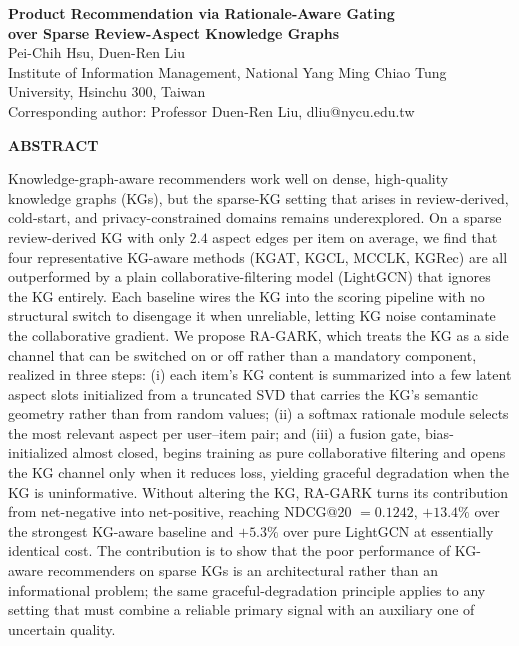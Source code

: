 \documentclass[12pt,a4paper]{article}
\begin{document}
\begin{center}
{\large\bfseries Product Recommendation via Rationale-Aware Gating\\ over Sparse Review-Aspect Knowledge Graphs}\\[0.9em]
{\normalsize Pei-Chih Hsu, Duen-Ren Liu}\\[0.3em]
{\small Institute of Information Management,
National Yang Ming Chiao Tung University, Hsinchu 300, Taiwan}\\[0.2em]
{\small * Corresponding author: Professor Duen-Ren Liu, dliu@nycu.edu.tw}
\end{center}

\vspace{0.6em}

\begin{center}{\bfseries ABSTRACT}\end{center}

Knowledge-graph-aware recommenders work well on dense, high-quality knowledge graphs (KGs), but the sparse-KG setting that arises in review-derived, cold-start, and privacy-constrained domains remains underexplored. On a sparse review-derived KG with only $2.4$ aspect edges per item on average, we find that four representative KG-aware methods (KGAT, KGCL, MCCLK, KGRec) are all outperformed by a plain collaborative-filtering model (LightGCN) that ignores the KG entirely. Each baseline wires the KG into the scoring pipeline with no structural switch to disengage it when unreliable, letting KG noise contaminate the collaborative gradient. We propose RA-GARK, which treats the KG as a side channel that can be switched on or off rather than a mandatory component, realized in three steps: (i) each item's KG content is summarized into a few latent aspect slots initialized from a truncated SVD that carries the KG's semantic geometry rather than from random values; (ii) a softmax rationale module selects the most relevant aspect per user--item pair; and (iii) a fusion gate, bias-initialized almost closed, begins training as pure collaborative filtering and opens the KG channel only when it reduces loss, yielding graceful degradation when the KG is uninformative. Without altering the KG, RA-GARK turns its contribution from net-negative into net-positive, reaching NDCG@20 $=0.1242$, $+13.4\%$ over the strongest KG-aware baseline and $+5.3\%$ over pure LightGCN at essentially identical cost. The contribution is to show that the poor performance of KG-aware recommenders on sparse KGs is an architectural rather than an informational problem; the same graceful-degradation principle applies to any setting that must combine a reliable primary signal with an auxiliary one of uncertain quality.
\end{document}
